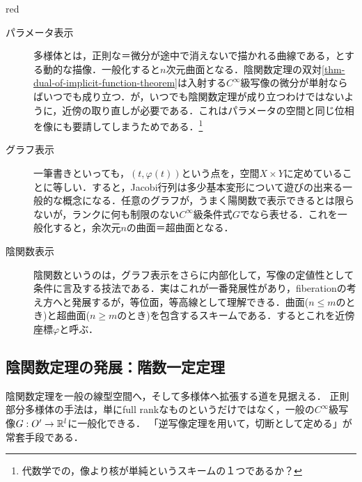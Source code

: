 \documentclass[uplatex,dvipdfmx]{jsreport}
\begin{document}
\begin{tbox}{red}{}
    \begin{description}
        \item[パラメータ表示] 多様体とは，正則な＝微分が途中で消えないで描かれる曲線である，とする動的な描像．一般化すると$n$次元曲面となる．陰関数定理の双対\ref{thm-dual-of-implicit-function-theorem}は入射する$C^\infty$級写像の微分が単射ならばいつでも成り立つ．が，いつでも陰関数定理が成り立つわけではないように，近傍の取り直しが必要である．これはパラメータの空間と同じ位相を像にも要請してしまうためである．\footnote{代数学での，像より核が単純というスキームの１つであるか？}
        \item[グラフ表示] 一筆書きといっても，$(t,\varphi(t))$という点を，空間$X\times Y$に定めていることに等しい．すると，Jacobi行列は多少基本変形について遊びの出来る一般的な概念になる．任意のグラフが，うまく陽関数で表示できるとは限らないが，ランクに何も制限のない$C^\infty$級条件式$G$でなら表せる．これを一般化すると，余次元$n$の曲面＝超曲面となる．
        \item[陰関数表示] 陰関数というのは，グラフ表示をさらに内部化して，写像の定値性として条件に言及する技法である．実はこれが一番発展性があり，fiberationの考え方へと発展するが，等位面，等高線として理解できる．曲面($n\le m$のとき)と超曲面($n\ge m$のとき)を包含するスキームである．するとこれを近傍座標$\varphi$と呼ぶ．
    \end{description}
\end{tbox}

\subsection{陰関数定理の発展：階数一定定理}\label{subsection-constant-rank-thm-in-Euclidean-space}

\begin{tcolorbox}[colframe=ForestGreen, colback=ForestGreen!10!white,breakable,colbacktitle=ForestGreen!40!white,coltitle=black,fonttitle=\bfseries\sffamily,
title=]
    陰関数定理を一般の線型空間へ，そして多様体へ拡張する道を見据える．
    正則部分多様体の手法は，単にfull rankなものというだけではなく，一般の$C^\infty$級写像$G:O'\to\mathbb{R}^l$に一般化できる．
    「逆写像定理を用いて，切断として定める」が常套手段である．
\end{tcolorbox}
\end{document}
